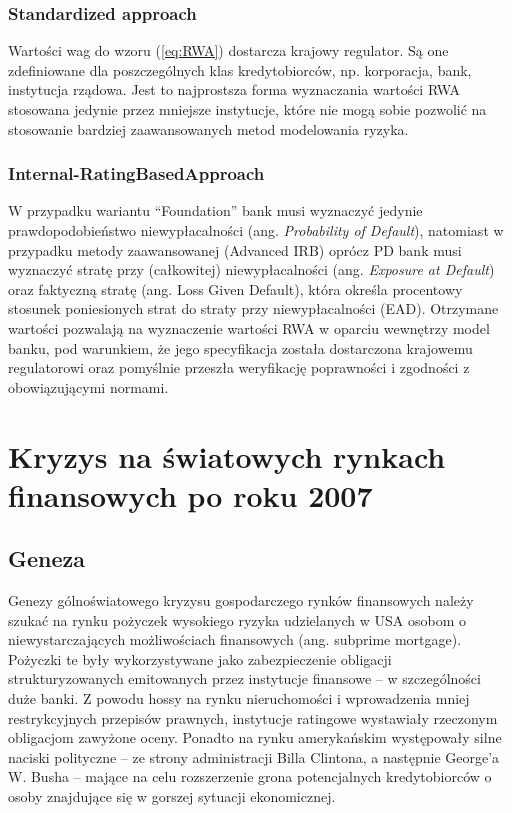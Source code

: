 \subsubsection{Standardized approach}

Wartości wag do wzoru (\ref{eq:RWA}) dostarcza krajowy regulator. Są one zdefiniowane dla poszczególnych klas kredytobiorców, np. korporacja, bank, instytucja rządowa. Jest to najprostsza forma wyznaczania wartości RWA stosowana jedynie przez mniejsze instytucje, które nie mogą sobie pozwolić na stosowanie bardziej zaawansowanych metod modelowania ryzyka.

\subsubsection{Internal-RatingBasedApproach}
W przypadku wariantu “Foundation” bank musi wyznaczyć jedynie prawdopodobieństwo niewypłacalności (ang. \textit{Probability of Default}), natomiast w przypadku metody zaawansowanej (Advanced IRB) oprócz PD bank musi wyznaczyć stratę przy (całkowitej) niewypłacalności (ang. \textit{Exposure at Default}) oraz faktyczną stratę (ang. Loss Given Default), która określa procentowy stosunek poniesionych strat do straty przy niewypłacalności (EAD). Otrzymane wartości pozwalają na wyznaczenie wartości RWA w oparciu wewnętrzy model banku, pod warunkiem, że jego specyfikacja została dostarczona krajowemu regulatorowi oraz pomyślnie przeszła weryfikację poprawności i zgodności z obowiązującymi normami.

\section{Kryzys na światowych rynkach finansowych po roku 2007}

\subsection{Geneza}

Genezy gólnoświatowego kryzysu gospodarczego rynków finansowych należy szukać na rynku pożyczek wysokiego ryzyka udzielanych w USA osobom o niewystarczających możliwościach finansowych (ang. subprime mortgage). Pożyczki te były wykorzystywane jako zabezpieczenie obligacji strukturyzowanych emitowanych przez instytucje finansowe – w szczególności duże banki. Z powodu hossy na rynku nieruchomości i wprowadzenia mniej restrykcyjnych przepisów prawnych, instytucje ratingowe wystawiały rzeczonym obligacjom zawyżone oceny. Ponadto na rynku amerykańskim występowały silne naciski polityczne – ze strony administracji Billa Clintona, a następnie George’a W. Busha – mające na celu rozszerzenie grona potencjalnych kredytobiorców o osoby znajdujące się w gorszej sytuacji ekonomicznej.

